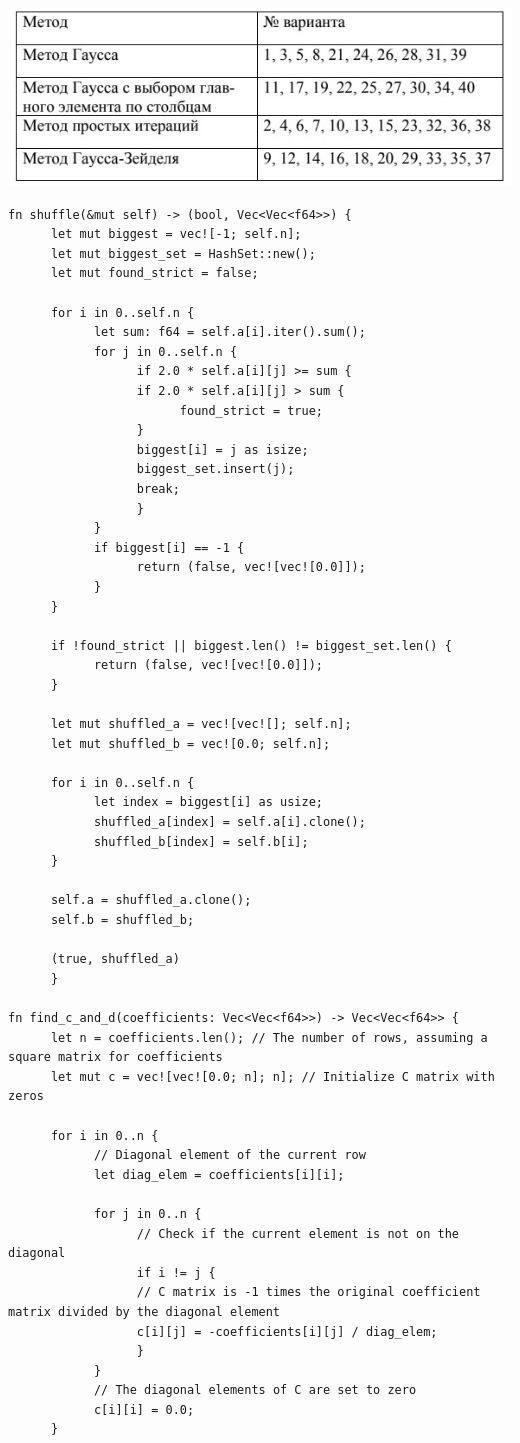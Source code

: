 \documentclass{article}
\begin{document}
\includegraphics{task.jpg}

\begin{lstlisting}
fn shuffle(&mut self) -> (bool, Vec<Vec<f64>>) {
      let mut biggest = vec![-1; self.n];
      let mut biggest_set = HashSet::new();
      let mut found_strict = false;

      for i in 0..self.n {
            let sum: f64 = self.a[i].iter().sum();
            for j in 0..self.n {
                  if 2.0 * self.a[i][j] >= sum {
                  if 2.0 * self.a[i][j] > sum {
                        found_strict = true;
                  }
                  biggest[i] = j as isize;
                  biggest_set.insert(j);
                  break;
                  }
            }
            if biggest[i] == -1 {
                  return (false, vec![vec![0.0]]);
            }
      }

      if !found_strict || biggest.len() != biggest_set.len() {
            return (false, vec![vec![0.0]]);
      }

      let mut shuffled_a = vec![vec![]; self.n];
      let mut shuffled_b = vec![0.0; self.n];

      for i in 0..self.n {
            let index = biggest[i] as usize;
            shuffled_a[index] = self.a[i].clone();
            shuffled_b[index] = self.b[i];
      }

      self.a = shuffled_a.clone();
      self.b = shuffled_b;

      (true, shuffled_a)
      }

fn find_c_and_d(coefficients: Vec<Vec<f64>>) -> Vec<Vec<f64>> {
      let n = coefficients.len(); // The number of rows, assuming a square matrix for coefficients
      let mut c = vec![vec![0.0; n]; n]; // Initialize C matrix with zeros

      for i in 0..n {
            // Diagonal element of the current row
            let diag_elem = coefficients[i][i];

            for j in 0..n {
                  // Check if the current element is not on the diagonal
                  if i != j {
                  // C matrix is -1 times the original coefficient matrix divided by the diagonal element
                  c[i][j] = -coefficients[i][j] / diag_elem;
                  }
            }
            // The diagonal elements of C are set to zero
            c[i][i] = 0.0;
      }


\end{lstlisting}
\end{document}
